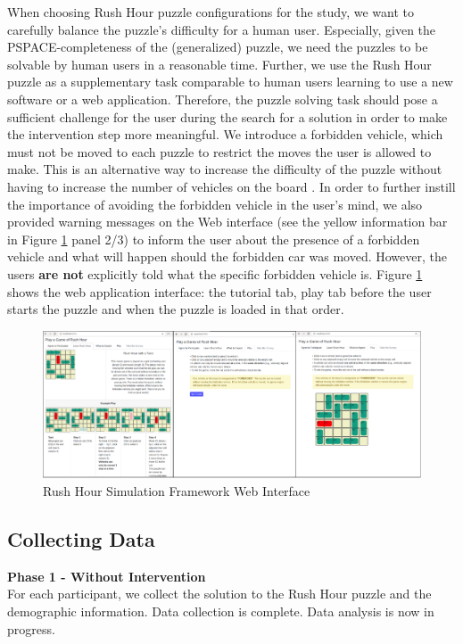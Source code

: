 When choosing Rush Hour puzzle configurations for the study, we want to carefully balance the puzzle's difficulty for a human user. Especially, given the PSPACE-completeness of the (generalized) puzzle, we need the puzzles to be solvable by human users in a reasonable time. Further, we use the Rush Hour puzzle as a supplementary task comparable to human users learning to use a new software or a web application. Therefore, the puzzle solving task should pose a sufficient challenge for the user during the search for a solution in order to make the intervention step more meaningful. We introduce a forbidden vehicle, which must not be moved to each puzzle to restrict the moves the user is allowed to make. This is an alternative way to increase the difficulty of the puzzle without having to increase the number of vehicles on the board \cite{fernau2003}. In order to further instill the importance of avoiding the forbidden vehicle in the user's mind, we also provided warning messages on the Web interface (see the yellow information bar in Figure \ref{fig:ui} panel 2/3) to inform the user about the presence of a forbidden vehicle and what will happen should the forbidden car was moved. However, the users \textbf{are not} explicitly told what the specific forbidden vehicle is.
Figure \ref{fig:ui} shows the web application interface: the tutorial tab, play tab before the user starts the puzzle and when the puzzle is loaded in that order.
\begin{figure}[!hbt]
  \centering
\includegraphics[width=\columnwidth]{img/UI.pdf}
  \caption{Rush Hour Simulation Framework Web Interface}
  \label{fig:ui}
\end{figure}



\subsection*{Collecting Data}
\textbf{Phase 1 - Without Intervention}\\
For each participant, we collect the solution to the Rush Hour puzzle and the demographic information. Data collection is complete. Data analysis is now in progress.

